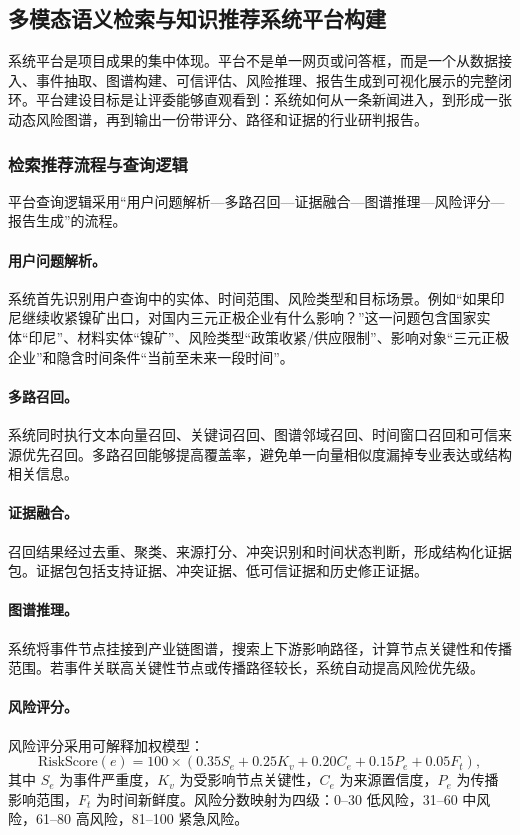 ﻿\documentclass[12pt,a4paper]{article}
\begin{document}
\subsection{多模态语义检索与知识推荐系统平台构建}

系统平台是项目成果的集中体现。平台不是单一网页或问答框，而是一个从数据接入、事件抽取、图谱构建、可信评估、风险推理、报告生成到可视化展示的完整闭环。平台建设目标是让评委能够直观看到：系统如何从一条新闻进入，到形成一张动态风险图谱，再到输出一份带评分、路径和证据的行业研判报告。

\subsubsection{检索推荐流程与查询逻辑}

平台查询逻辑采用“用户问题解析—多路召回—证据融合—图谱推理—风险评分—报告生成”的流程。

\paragraph{用户问题解析。}系统首先识别用户查询中的实体、时间范围、风险类型和目标场景。例如“如果印尼继续收紧镍矿出口，对国内三元正极企业有什么影响？”这一问题包含国家实体“印尼”、材料实体“镍矿”、风险类型“政策收紧/供应限制”、影响对象“三元正极企业”和隐含时间条件“当前至未来一段时间”。

\paragraph{多路召回。}系统同时执行文本向量召回、关键词召回、图谱邻域召回、时间窗口召回和可信来源优先召回。多路召回能够提高覆盖率，避免单一向量相似度漏掉专业表达或结构相关信息。

\paragraph{证据融合。}召回结果经过去重、聚类、来源打分、冲突识别和时间状态判断，形成结构化证据包。证据包包括支持证据、冲突证据、低可信证据和历史修正证据。

\paragraph{图谱推理。}系统将事件节点挂接到产业链图谱，搜索上下游影响路径，计算节点关键性和传播范围。若事件关联高关键性节点或传播路径较长，系统自动提高风险优先级。

\paragraph{风险评分。}风险评分采用可解释加权模型：
\begin{equation}
\text{RiskScore}(e)=100\times(0.35S_e+0.25K_v+0.20C_e+0.15P_e+0.05F_t),
\end{equation}
其中 $S_e$ 为事件严重度，$K_v$ 为受影响节点关键性，$C_e$ 为来源置信度，$P_e$ 为传播影响范围，$F_t$ 为时间新鲜度。风险分数映射为四级：0--30 低风险，31--60 中风险，61--80 高风险，81--100 紧急风险。
\end{document}
